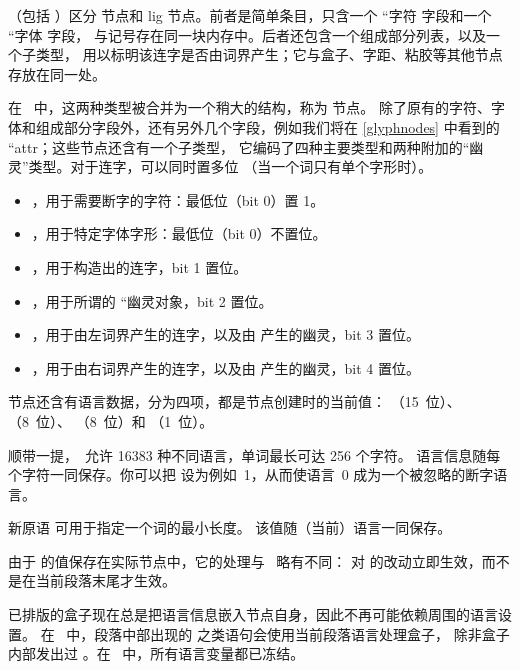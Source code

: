 （包括 \PDFTEX）区分  节点和 \type
{lig} 节点。前者是简单条目，只含一个 ``字符 字段和一个 ``字体 字段，
与记号存在同一块内存中。后者还包含一个组成部分列表，以及一个子类型，
用以标明该连字是否由词界产生；它与盒子、字距、粘胶等其他节点存放在同一处。

在 \LUATEX\ 中，这两种类型被合并为一个稍大的结构，称为  节点。
除了原有的字符、字体和组成部分字段外，还有另外几个字段，例如我们将在
\ref{glyphnodes} 中看到的 ``attr；这些节点还含有一个子类型，
它编码了四种主要类型和两种附加的“幽灵”类型。对于连字，可以同时置多位
（当一个词只有单个字形时）。

\begin{itemize}\item {}，用于需要断字的字符：最低位（bit 0）置 1。
    
    \item {}，用于特定字体字形：最低位（bit 0）不置位。
    
    \item {}，用于构造出的连字，bit 1 置位。
    
    \item {}，用于所谓的 ``幽灵对象，bit 2 置位。
    
    \item {}，用于由左词界产生的连字，以及由 
        产生的幽灵，bit 3 置位。
    
    \item {}，用于由右词界产生的连字，以及由 
        产生的幽灵，bit 4 置位。
    
\end{itemize}

 节点还含有语言数据，分为四项，都是节点创建时的当前值：
（15~位）、（8~位）、
（8~位）和 （1~位）。

顺带一提，\LUATEX\ 允许 16383 种不同语言，单词最长可达 256 个字符。
语言信息随每个字符一同保存。你可以把 
设为例如~1，从而使语言~0 成为一个被忽略的断字语言。

新原语  可用于指定一个词的最小长度。
该值随（当前）语言一同保存。

由于  的值保存在实际节点中，它的处理与 \ 略有不同：
对  的改动立即生效，而不是在当前段落末尾才生效。

已排版的盒子现在总是把语言信息嵌入节点自身，因此不再可能依赖周围的语言设置。
在 \ 中，段落中部出现的  之类语句会使用当前段落语言处理盒子，
除非盒子内部发出过 。在 \LUATEX\ 中，所有语言变量都已冻结。


